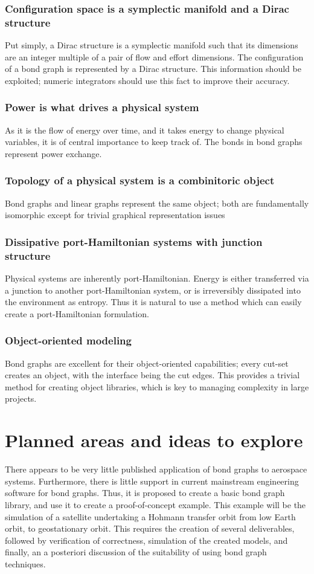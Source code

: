 \documentclass[utf,a4paper,12pt]{report}
\begin{document}
\subsection{Configuration space is a symplectic manifold and a Dirac structure}
Put simply, a Dirac structure is a symplectic manifold such that its dimensions are an integer multiple of a pair of flow and effort dimensions. The configuration of a bond graph is represented by a Dirac structure. This information should be exploited; numeric integrators should use this fact to improve their accuracy. 
\subsection{Power is what drives a physical system}
As it is the flow of energy over time, and it takes energy to change physical variables, it is of central importance to keep track of. The bonds in bond graphs represent power exchange.
\subsection{Topology of a physical system is a combinitoric object}
Bond graphs and linear graphs represent the same object; both are fundamentally isomorphic except for trivial graphical representation issues
\subsection{Dissipative port-Hamiltonian systems with junction structure}
Physical systems are inherently port-Hamiltonian. Energy is either transferred via a junction to another port-Hamiltonian system, or is irreversibly dissipated into the environment as entropy. Thus it is natural to use a method which can easily create a port-Hamiltonian formulation.
\subsection{Object-oriented modeling}
Bond graphs are excellent for their object-oriented capabilities; every cut-set creates an object, with the interface being the cut edges. This provides a trivial method for creating object libraries, which is key to managing complexity in large projects.
\chapter{Planned areas and ideas to explore}
There appears to be very little published application of bond graphs to aerospace systems. Furthermore, there is little support in current mainstream engineering software for bond graphs. Thus, it is proposed to create a basic bond graph library, and use it to create a proof-of-concept example. This example will be the simulation of a satellite undertaking a Hohmann transfer orbit from low Earth orbit, to geostationary orbit. This requires the creation of several deliverables, followed by verification of correctness, simulation of the created models, and finally, an a posteriori discussion of the suitability of using bond graph techniques.
\end{document}
